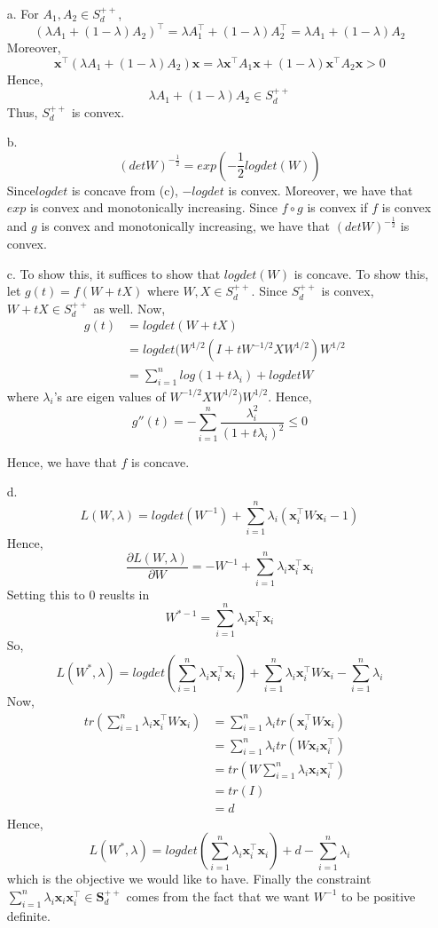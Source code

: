 \documentclass[11pt]{article}
\theoremstyle{remark}
\newcommand{\bx}{\mathbf{x}}
\begin{document}
\color{blue}
\begin{itemize}
\item[a.]
For $A_1,A_2\in S_d^{++}$, 
$$(\lambda A_1+(1-\lambda)A_2)^\intercal = \lambda A_1^\intercal + (1-\lambda)A_2^\intercal = \lambda A_1+ (1-\lambda)A_2 $$
Moreover,
$$\bx^\intercal (\lambda A_1+(1-\lambda)A_2) \bx = \lambda \bx^\intercal A_1 \bx + (1-\lambda) \bx^\intercal A_2 \bx > 0$$
Hence,
$$\lambda A_1+ (1-\lambda)A_2 \in S_d^{++}$$
Thus, $S_d^{++}$ is convex.

\item[b.]
$$(detW)^{-\frac{1}{2}}=exp(-\frac{1}{2}logdet(W))$$
Since$logdet$ is concave from (c), $-logdet$ is convex. Moreover, we have that $exp$ is convex and monotonically increasing. Since $f\circ g$ is convex if $f$ is convex and $g$ is convex and monotonically increasing, we have that $(detW)^{-\frac{1}{2}}$ is convex.

\item[c.]
To show this, it suffices to show that $logdet(W)$ is concave. To show this, let $g(t)=f(W+tX)$ where $W,X \in S_d^{++}$. Since  $S_d^{++}$ is convex, $W+tX \in S_d^{++}$ as well. Now,
\begin{align*}
g(t) &= logdet(W+tX) &\\
&= logdet(W^{1/2}(I+tW^{-1/2}XW^{1/2})W^{1/2} &\\
&= \sum_{i=1}^n log(1+t\lambda_i)+logdet W
\end{align*}
where $\lambda_i$'s are eigen values of $W^{-1/2}XW^{1/2})W^{1/2}$. Hence, 
$$g''(t) = -\sum_{i=1}^n \frac{\lambda_i^2}{(1+t\lambda_i)^2} \leq 0$$

Hence, we have that $f$ is concave.

\item[d.]
$$L(W,\lambda)=logdet(W^{-1})+\sum_{i=1}^n \lambda_i(\bx_i^\intercal W \bx_i-1)$$
Hence, 
$$\frac{\partial L(W,\lambda)}{\partial W} = -W^{-1}+\sum_{i=1}^n \lambda_i \bx_i^\intercal \bx_i$$
Setting this to $0$ reuslts in
$$W^{*-1} = \sum_{i=1}^n \lambda_i \bx_i^\intercal \bx_i$$
So,
$$L(W^*,\lambda)=logdet(\sum_{i=1}^n \lambda_i \bx_i^\intercal \bx_i) + \sum_{i=1}^n \lambda_i  \bx_i^\intercal W \bx_i - \sum_{i=1}^n \lambda_i $$
Now,
\begin{align*}
tr(\sum_{i=1}^n \lambda_i  \bx_i^\intercal W \bx_i)&=\sum_{i=1}^n \lambda_i  tr(\bx_i^\intercal W \bx_i) &\\
&= \sum_{i=1}^n \lambda_i  tr(W \bx_i \bx_i^\intercal) &\\
&= tr(W \sum_{i=1}^n \lambda_i \bx_i \bx_i^\intercal) &\\
&= tr(I) &\\
&= d
\end{align*}
Hence,
$$L(W^*,\lambda)=logdet(\sum_{i=1}^n \lambda_i \bx_i^\intercal \bx_i) + d - \sum_{i=1}^n \lambda_i$$
which is the objective we would like to have.
Finally the constraint $\sum_{i=1}^n \lambda_i
            \bx_i\bx_i^\intercal\in\mathbf{S}_d^{++}$ comes from the fact that we want $W^{-1}$ to be positive definite.
            

\end{itemize}
\end{document}
